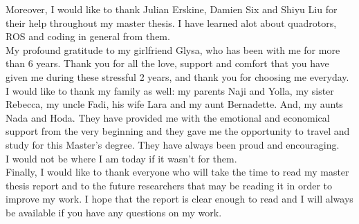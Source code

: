 \documentclass{thesisreport}
\begin{document}
Moreover, I would like to thank Julian Erskine, Damien Six and Shiyu Liu for their help throughout my master thesis. I have learned alot about quadrotors, ROS and coding in general from them. \\

My profound gratitude to my girlfriend Glysa, who has been with me for more than 6 years. Thank you for all the love, support and comfort that you have given me during these stressful 2 years, and thank you for choosing me everyday. \\

I would like to thank my family as well: my parents Naji and Yolla, my sister Rebecca, my uncle Fadi, his wife Lara and my aunt Bernadette. And, my aunts Nada and Hoda. They have provided me with the emotional and economical support from the very beginning and they gave me the opportunity to travel and study for this Master's degree. They have always been proud and encouraging. \\I would not be where I am today if it wasn't for them. \\

Finally, I would like to thank everyone who will take the time to read my master thesis report and to the future researchers that may be reading it in order to improve my work. I hope that the report is clear enough to read and I will always be available if you have any questions on my work.
 
 \newpage
 
 
\end{document}
